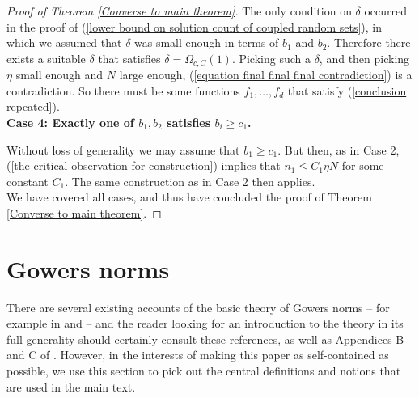 \documentclass[12pt,a4paper,twoside,reqno]{amsart}
\numberwithin{equation}{section}
\begin{document}
\begin{proof}[Proof of Theorem \ref{Converse to main theorem}]
The only condition on $\delta$ occurred in the proof of (\ref{lower bound on solution count of coupled random sets}), in which we assumed that $\delta$ was small enough in terms of $b_1$ and $b_2$. Therefore there exists a suitable $\delta$ that satisfies $\delta = \Omega_{c,C}(1)$. Picking such a $\delta$, and then picking $\eta$ small enough and $N$ large enough, (\ref{equation final final final contradiction}) is a contradiction. So there must be some functions $f_1,\dots,f_d$ that satisfy (\ref{conclusion repeated}). \\

\noindent \textbf{Case 4: Exactly one of $b_1,b_2$ satisfies $b_i\geqslant c_1$.}

Without loss of generality we may assume that $b_1\geqslant c_1$. But then, as in Case 2, (\ref{the critical observation for construction}) implies that $n_1\leqslant C_1\eta N$ for some constant $C_1$. The same construction as in Case 2 then applies.\\



We have covered all cases, and thus have concluded the proof of Theorem \ref{Converse to main theorem}. 
\end{proof}
\newpage
\appendix

\section{Gowers norms}
\label{sec.Gowers norms}

There are several existing accounts of the basic theory of Gowers norms -- for example in \cite{Gr07} and \cite{Ta12} -- and the reader looking for an introduction to the theory in its full generality should certainly consult these references, as well as Appendices B and C of \cite{GT10}. However, in the interests of making this paper as self-contained as possible, we use this section to pick out the central definitions and notions that are used in the main text. 
\end{document}
